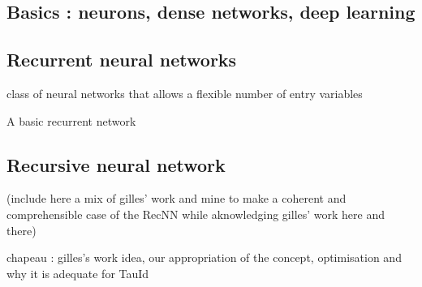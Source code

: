 \subsection{Basics : neurons, dense networks, deep learning}

\subsection{Recurrent neural networks}

class of neural networks that allows a flexible number of entry variables

A basic recurrent network

\subsection{Recursive neural network}

(include here a mix of gilles' work and mine to make a coherent and comprehensible case of the RecNN while aknowledging gilles' work here and there)

chapeau : gilles's work idea, our appropriation of the concept, optimisation and why it is adequate for TauId